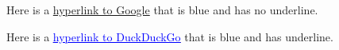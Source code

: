 \documentclass{article}
\newcommand{\bluehrefuline}[2]{\href{#1}{\textcolor{blue}{\uline{#2}}}}
\begin{document}
Here is a \href{https://www.google.com}{hyperlink to Google} that is blue and has no underline.

Here is a \bluehrefuline{https://www.duckduckgo.com}{hyperlink to DuckDuckGo} that is blue and has underline.
\end{document}
